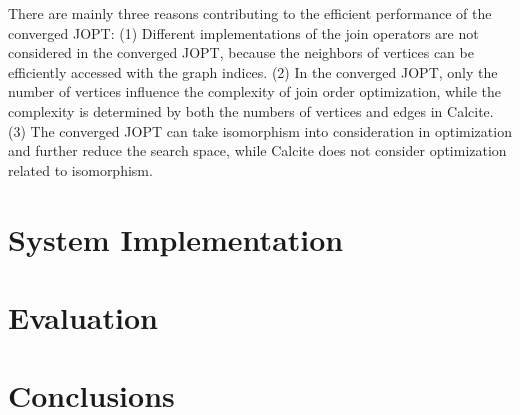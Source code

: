 \documentclass[sigconf, nonacm]{acmart}
\begin{document}
There are mainly three reasons contributing to the efficient performance of the converged JOPT:
(1) Different implementations of the join operators are not considered in the converged JOPT, because the neighbors of vertices can be efficiently accessed with the graph indices.
(2) In the converged JOPT, only the number of vertices influence the complexity of join order optimization, while the complexity is determined by both the numbers of vertices and edges in Calcite.
(3) The converged JOPT can take isomorphism into consideration in optimization and further reduce the search space, while Calcite does not consider optimization related to isomorphism.


\section{System Implementation}
\label{sec:system-implementation}


\section{Evaluation}
\label{sec:evaluation}


\section{Conclusions}
\label{sec:conclusions}






\end{document}
